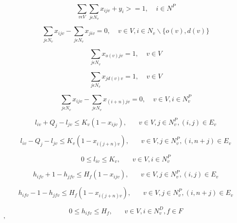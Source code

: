 \documentclass[a4paper,12pt]{article}
\begin{document}
\begin{equation} \label{eq:3}
    \sum_{v\epsilon V}\sum_{j\epsilon N_v}x_{ijv} + y_i >= 1, ~~~~~ i \in N^P
\end{equation}

\begin{equation} \label{eq:4}
    \sum_{j\epsilon N_v}x_{ijv} - \sum_{j\epsilon N_v}x_{jiv} = 0, ~~~~~ v \in V, i\in N_v \backslash \{o(v), d(v)\} 
\end{equation}

\begin{equation} \label{eq:5}
    \sum_{j\epsilon N_v}x_{o(v)jv} = 1, ~~~~~ v \in V
\end{equation}

\begin{equation} \label{eq:6}
    \sum_{j\epsilon N_v}x_{j d(v)v} = 1, ~~~~~ v \in V
\end{equation}

\begin{equation} \label{eq:7}
    \sum_{j\epsilon N_v}x_{ijv} - \sum_{j\epsilon N_v}x_{(i+n)jv} = 0, ~~~~~ v \in V, i\in N^P_v
\end{equation}

\begin{equation} \label{eq:8}
    l_{iv} + Q_j - l_{jv} \leq K_v(1-x_{ijv}),~~~~~~~~ v \in V,j\in N_v^P,(i,j) \in E_v
\end{equation}

\begin{equation} \label{eq:9}
    l_{iv} - Q_j - l_{jv} \leq K_v(1-x_{i(j+n)v}), ~~~~~~~~ v \in V,j\in N_v^P, (i, n+j)\in E_v
\end{equation}

\begin{equation} \label{eq:10}
0 \leq l_{iv} \leq K_v, ~~~~~~~~ v \in V, i \in N^P_v
\end{equation}

\begin{equation} \label{eq:11}
    h_{ifv} + 1 - h_{jfv} \leq H_f(1-x_{ijv}), ~~~~~~~~ v \in V,j\in N_v^P, (i, j)\in E_v
\end{equation}

\begin{equation} \label{eq:12}
    h_{ifv} - 1 - h_{jfv} \leq H_f(1-x_{i(j+n)v}), ~~~~~~~~ v \in V,j\in N_v^P, (i, n+j)\in E_v
\end{equation}

\begin{equation} \label{eq:13}
0 \leq h_{ifv} \leq H_f, ~~~~~~~~ v \in V, i \in N^D_v, f \in F
\end{equation}'
\end{document}
